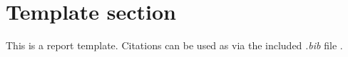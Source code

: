 \section{Template section}

This is a report template. Citations can be used as via the included \emph{.bib} file \cite{acke2020}.